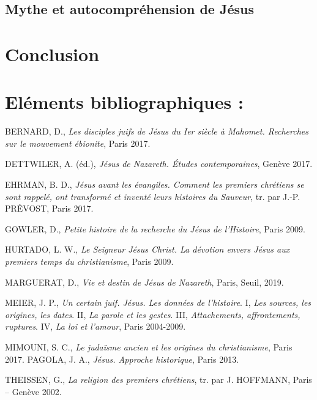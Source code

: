 \subsection{Mythe et autocompréhension de Jésus}
 

 \section{Conclusion}



\section{Eléments bibliographiques :}

BERNARD, D., \emph{Les disciples juifs de Jésus du Ier siècle à Mahomet.
Recherches sur le mouvement ébionite}, Paris 2017.

DETTWILER, A. (éd.), \emph{Jésus de Nazareth. Études contemporaines},
Genève 2017.

EHRMAN, B. D., \emph{Jésus avant les évangiles. Comment les premiers
chrétiens se sont rappelé, ont transformé et inventé leurs histoires du
Sauveur}, tr. par J.-P. PRÊVOST, Paris 2017.

GOWLER, D., \emph{Petite histoire de la recherche du Jésus de
l'Histoire}, Paris 2009.

HURTADO, L. W., \emph{Le Seigneur Jésus Christ. La dévotion envers Jésus
aux premiers temps du christianisme}, Paris 2009.

MARGUERAT, D., \emph{Vie et destin de Jésus de Nazareth}, Paris, Seuil,
2019.

MEIER, J. P., \emph{Un certain juif. Jésus. Les données de l'histoire}.
I, \emph{Les sources, les origines, les dates}. II, \emph{La parole et
les gestes}. III, \emph{Attachements, affrontements, ruptures}. IV,
\emph{La loi et l'amour}, Paris 2004-2009.

MIMOUNI, S. C., \emph{Le judaïsme ancien et les origines du
christianisme}, Paris 2017. PAGOLA, J. A., \emph{Jésus. Approche
historique}, Paris 2013.

THEISSEN, G., \emph{La religion des premiers chrétiens}, tr. par J.
HOFFMANN, Paris -- Genève 2002.

